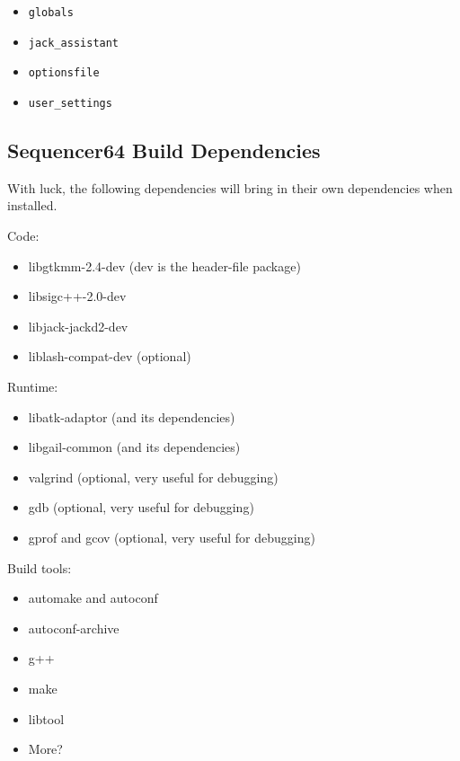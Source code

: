        \begin{itemize}
           \item \texttt{globals}
           \item \texttt{jack\_assistant}
           \item \texttt{optionsfile}
           \item \texttt{user\_settings}
        \end{itemize}

\subsection{Sequencer64 Build Dependencies}
\label{subsec:seq64_build_dependencies}

   With luck, the following dependencies will bring in their own
   dependencies when installed.

   Code:

     \begin{itemize}
        \item libgtkmm-2.4-dev (dev is the header-file package)
        \item libsigc++-2.0-dev
        \item libjack-jackd2-dev
        \item liblash-compat-dev (optional)
     \end{itemize}

   Runtime:

     \begin{itemize}
        \item libatk-adaptor (and its dependencies)
        \item libgail-common (and its dependencies)
        \item valgrind (optional, very useful for debugging)
        \item gdb (optional, very useful for debugging)
        \item gprof and gcov (optional, very useful for debugging)
     \end{itemize}

   Build tools:

     \begin{itemize}
        \item automake and autoconf
        \item autoconf-archive
        \item g++
        \item make
        \item libtool
        \item More?
     \end{itemize}

